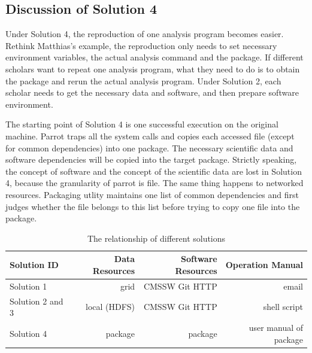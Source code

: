 \documentclass{acm_proc_article-sp}
\begin{document}
\subsection{Discussion of Solution 4} 

Under Solution 4, the reproduction of one analysis program becomes easier.
Rethink Matthias's example, the reproduction only needs
to set necessary environment variables, the actual analysis command
and the package. If different scholars want to repeat one analysis program,
what they need to do is to obtain the package and rerun the actual analysis
program. Under Solution 2, each scholar needs to get the necessary data and
software, and then prepare software environment. 

The starting point of Solution 4 is one successful execution on the original machine. 
Parrot traps all the system calls and copies each accessed file (except for common dependencies) into one package.
The necessary scientific data and software dependencies will be copied into the target package.
Strictly speaking, the concept of software and the concept of the scientific data are lost in Solution 4, because
the granularity of parrot is file.
The same thing happens to networked resources.
Packaging utlity maintains one list of common dependencies and first judges whether the file belongs to this list before trying to copy one file into the package.

\begin{table}
    \centering
    \begin{tabular}{|l|r|r|r|}
        \hline
        Solution ID & Data Resources & Software Resources & Operation Manual \\ \hline
        Solution 1& grid & CMSSW Git HTTP & email \\ \hline
        Solution 2 and 3& local (HDFS) & CMSSW Git HTTP & shell script \\ \hline
        Solution 4& package & package & user manual of package \\ \hline
    \end{tabular}
    \caption{The relationship of different solutions}
    \label{table:relationship}
\end{table}

\end{document}
